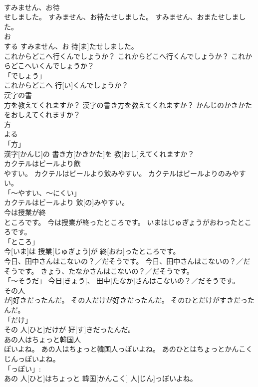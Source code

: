 \documentclass[8pt]{extreport}
\begin{document}
\begin{CJK}{UTF8}{min}
\\	すみません、お待
\\	せしました。	すみません、お待たせしました。	すみません、おまたせしました。	
\\	お 
\\	する	すみません、お 待[ま]たせしました。		
\\	これからどこへ行くんでしょうか？	これからどこへ行くんでしょうか？	これからどこへいくんでしょうか？	
\\	「でしょう」 
\\	これからどこへ 行[い]くんでしょうか？		
\\	漢字の書
\\	方を教えてくれますか？	漢字の書き方を教えてくれますか？	かんじのかきかたをおしえてくれますか？	
\\	方 
\\	よる 
\\	「方」 
\\	漢字[かんじ]の 書き方[かきかた]を 教[おし]えてくれますか？		
\\	カクテルはビールより飲
\\	やすい。	カクテルはビールより飲みやすい。	カクテルはビールよりのみやすい。	
\\	「～やすい、～にくい」 
\\	カクテルはビールより 飲[の]みやすい。		
\\	今は授業が終
\\	ところです。	今は授業が終ったところです。	いまはじゅぎょうがおわったところです。	
\\	「ところ」 
\\	今[いま]は 授業[じゅぎょう]が 終[おわ]ったところです。		
\\	今日、田中さんはこないの？／だそうです。	今日、田中さんはこないの？／だそうです。	きょう、たなかさんはこないの？／だそうです。	
\\	「～そうだ」	今日[きょう]、 田中[たなか]さんはこないの？／だそうです。		
\\	その人
\\	が]好きだったんだ。	その人だけが好きだったんだ。	そのひとだけがすきだったんだ。	
\\	「だけ」 
\\	その 人[ひと]だけが 好[す]きだったんだ。		
\\	あの人はちょっと韓国人
\\	ぽいよね。	あの人はちょっと韓国人っぽいよね。	あのひとはちょっとかんこくじんっぽいよね。	
\\	「っぽい」: 
\\	あの 人[ひと]はちょっと 韓国[かんこく] 人[じん]っぽいよね。		

\end{CJK}
\end{document}
